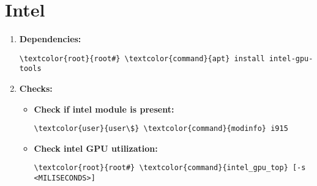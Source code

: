 \documentclass[10pt, a4paper, onecolumn, openany]{book} %
\begin{document}
\section{Intel}
\begin{enumerate}
    \item \textbf{Dependencies:}
\begin{Verbatim}[commandchars=\\\{\}]
\textcolor{root}{root#} \textcolor{command}{apt} install intel-gpu-tools
\end{Verbatim}
    \item \textbf{Checks:}
\begin{itemize}
    \item \textbf{Check if intel module is present:}
\begin{Verbatim}[commandchars=\\\{\}]
\textcolor{user}{user\$} \textcolor{command}{modinfo} i915
\end{Verbatim}
    \item \textbf{Check intel GPU utilization:}
\begin{Verbatim}[commandchars=\\\{\}]
\textcolor{root}{root#} \textcolor{command}{intel_gpu_top} [-s <MILISECONDS>]
\end{Verbatim}
\end{itemize}
\end{enumerate}
\end{document}
